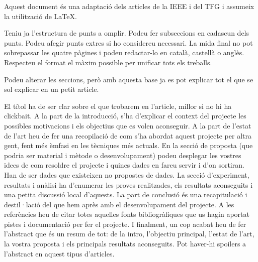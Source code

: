 ﻿\documentclass[10pt,a4paper,twocolumn,twoside]{article}
\begin{document}
Aquest document és una adaptació dels articles de la IEEE i del TFG i assumeix la utilització de \LaTeX \cite{latex}. 

Teniu ja l'estructura de punts a omplir. Podeu fer subseccions en cadascun dels punts. Podeu afegir punts extres si ho considereu necessari. La mida final no pot sobrepassar les quatre pàgines i podeu redactar-lo en català, castellà o anglès. Respecteu el format el màxim possible per unificar tots els treballs.


Podeu alterar les seccions, però amb aquesta base ja es pot explicar tot el que se sol explicar en un petit article. 

El títol ha de ser clar sobre el que trobarem en l’article, millor si no hi ha clickbait. A la part de la introducció, s'ha d’explicar el context del projecte les possibles motivacions i els objectius que es volen aconseguir. A la part de l’estat de l’art heu de fer una recopilació de com s’ha abordat aquest projecte per altra gent, fent més èmfasi en les tècniques més actuals. En la secció de proposta (que podria ser material i mètode o desenvolupament) podeu desplegar les vostres idees de com resoldre el projecte i quines dades en fareu servir i d’on sortiran. Han de ser dades que existeixen no propostes de dades. La secció d’experiment, resultats i anàlisi ha d’enumerar les proves realitzades, els resultats aconseguits i una petita discussió local d’aquests. La part de conclusió és una recapitulació i destil·lació del que hem après amb el desenvolupament del projecte. A les referències heu de citar totes aquelles fonts bibliogràfiques que us hagin aportat pistes i documentació per fer el projecte. I finalment, un cop acabat heu de fer l’abstract que és un resum de tot: de la intro, l’objectiu principal, l’estat de l’art, la vostra proposta i els principals resultats aconseguits. Pot haver-hi spoilers a l’abstract en aquest tipus d’articles. 
\end{document}
